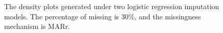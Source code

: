\documentclass[12pt, fullpage, a4paper]{article}
\begin{document}
\begin{figure}[ht!]
	\begin{center}
	\end{center}
	\caption{The density plots generated under two logistic regression imputation models. The percentage of missing is 30\%, and the missingness mechanism is MARr.}
	\label{fig10}
\end{figure}
\end{document}
